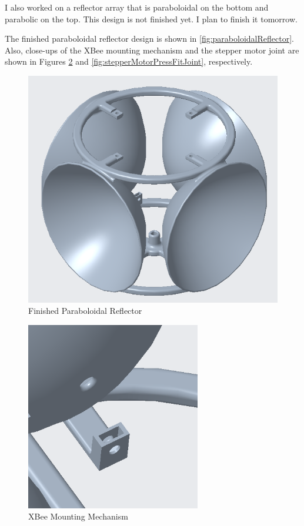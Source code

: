 \documentclass[fontsize=11pt, %
                             paper=letter, %
                             openany, %
                             captions=tableheading,
                             index=totoc,
                             hyperref]{labbook}
\begin{document}
\begin{addmargin}[0cm]{0cm}
I also worked on a reflector array that is paraboloidal on the bottom and parabolic on the top. This design is not finished yet. I plan to finish it tomorrow.

The finished paraboloidal reflector design is shown in \autoref{fig:paraboloidalReflector}. Also, close-ups of the XBee mounting mechanism and the stepper motor joint are shown in Figures \ref{fig:XBeeMountingBracket} and \ref{fig:stepperMotorPressFitJoint}, respectively.

\begin{figure}[h!]
    \center
    \includegraphics[width=5in]{figs/img/paraboloidalReflector.png}
    \caption{Finished Paraboloidal Reflector}
    \label{fig:paraboloidalReflector}
\end{figure}

\begin{figure}[h!]
    \center
    \includegraphics[width=3in]{figs/img/XBeeMountingBracket.png}
    \caption{XBee Mounting Mechanism}
    \label{fig:XBeeMountingBracket}
\end{figure}


\end{addmargin}
\end{document}
